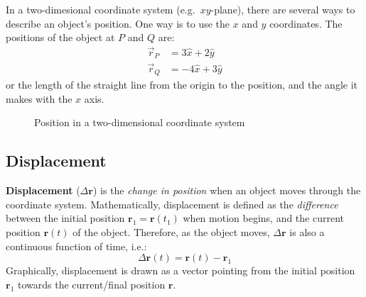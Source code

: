 In a two-dimesional coordinate system (e.g.\ $xy$-plane),
there are several ways to describe an object's position. One way is to use the
$x$ and $y$ coordinates. The positions of the object at $P$ and $Q$ are:
\begin{align*}
  \vec r_P & =3\hat x + 2\hat y\\
  \vec r_Q & =-4\hat x + 3\hat y
\end{align*}
or the length of the straight line from the origin to
the position, and the angle it makes with the $x$ axis.
\begin{figure}[ht]
  \centering
  \caption{Position in a two-dimensional coordinate system}
\end{figure}



\subsection{Displacement}
\textbf{Displacement} ($\Delta\mathbf r$) is the \emph{change in position} when
an object moves through the coordinate system. Mathematically, displacement is
defined as the \emph{difference} between the initial position
$\mathbf r_1=\mathbf r(t_1)$ when motion begins, and the current position
$\mathbf r(t)$ of the object. Therefore, as the object moves, $\Delta\mathbf r$
is also a continuous function of time, i.e.:
\begin{equation}
  \boxed{
    \Delta\mathbf r(t)=\mathbf r(t)-\mathbf r_1
  }
\end{equation}
Graphically, displacement is drawn as a vector pointing from the initial
position $\mathbf r_1$ towards the current/final position $\mathbf r$.

